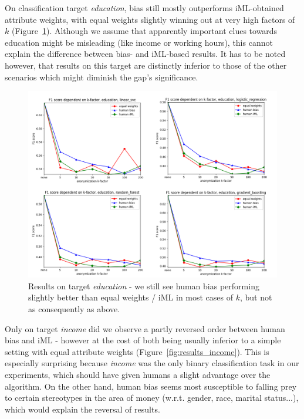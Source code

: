 \documentclass{llncs}
\begin{document}
On classification target \textit{education}, bias still mostly outperforms iML-obtained attribute weights, with equal weights slightly winning out at very high factors of $k$ (Figure~\ref{fig:results_education}). Although we assume that apparently important clues towards education might be misleading (like income or working hours), this cannot explain the difference between bias- and iML-based results. It has to be noted however, that results on this target are distinctly inferior to those of the other scenarios which might diminish the gap's significance.

\begin{figure}[!h]
	\begin{center}
		\includegraphics[width=1\textwidth]{figures/education_num.png}
		\caption{Results on target \textit{education} - we still see human bias performing slightly better than equal weights / iML in most cases of $k$, but not as consequently as above.}
		\label{fig:results_education}
	\end{center}
\end{figure}


Only on target \textit{income} did we observe a partly reversed order between human bias and iML - however at the cost of both being usually inferior to a simple setting with equal attribute weights (Figure~\ref{fig:results_income}). This is especially surprising because \textit{income} was the only binary classification task in our experiments, which should have given humans a slight advantage over the algorithm. On the other hand, human bias seems most susceptible to falling prey to certain stereotypes in the area of money (w.r.t. gender, race, marital status...), which would explain the reversal of results.
\end{document}
